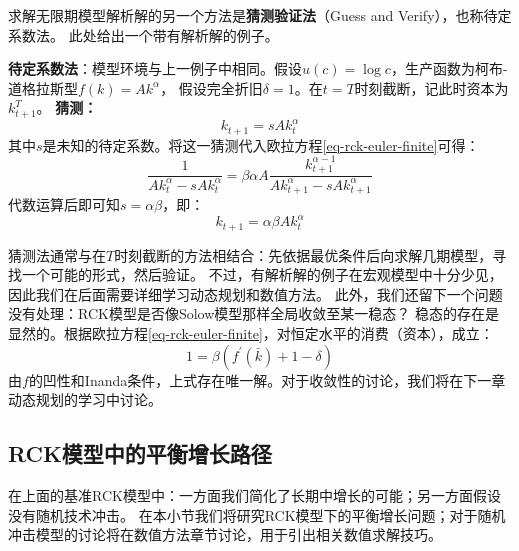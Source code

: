 求解无限期模型解析解的另一个方法是\textbf{猜测验证法}（Guess and Verify），也称待定系数法。
此处给出一个带有解析解的例子。
\begin{example}
    \textbf{待定系数法}：模型环境与上一例子中相同。假设$u(c)=\log c$，生产函数为柯布-道格拉斯型$f(k)=Ak^{\alpha}$，
    假设完全折旧$\delta=1$。在$t=T$时刻截断，记此时资本为$k_{t+1}^T$。
    \textbf{猜测：}
    \begin{equation*}
        k_{t+1} = s Ak_t^{\alpha}
    \end{equation*}
    其中$s$是未知的待定系数。将这一猜测代入欧拉方程\cref{eq-rck-euler-finite}可得：
    \begin{equation*}
        \frac{1}{A k_t^\alpha-s A k_t^\alpha} = 
            \beta \alpha A \frac{k_{t+1}^{\alpha-1}}{A k_{t+1}^\alpha-s A k_{t+1}^\alpha}
    \end{equation*}
    代数运算后即可知$s=\alpha\beta$，即：
    \begin{equation*}
        k_{t+1} = \alpha \beta A k_t^{\alpha}
    \end{equation*}
\end{example}

猜测法通常与在$T$时刻截断的方法相结合：先依据最优条件后向求解几期模型，寻找一个可能的形式，然后验证。
不过，有解析解的例子在宏观模型中十分少见，因此我们在后面需要详细学习动态规划和数值方法。
此外，我们还留下一个问题没有处理：RCK模型是否像Solow模型那样全局收敛至某一稳态？
稳态的存在是显然的。根据欧拉方程\cref{eq-rck-euler-finite}，对恒定水平的消费（资本），成立：
\begin{equation}
    1 = \beta \left(f^{\prime}(\bar{k})+1-\delta\right)
\end{equation}
由$f$的凹性和Inanda条件，上式存在唯一解。对于收敛性的讨论，我们将在下一章动态规划的学习中讨论。


\subsection{RCK模型中的平衡增长路径}

在上面的基准RCK模型中：一方面我们简化了长期中增长的可能；另一方面假设没有随机技术冲击。
在本小节我们将研究RCK模型下的平衡增长问题；对于随机冲击模型的讨论将在数值方法章节讨论，用于引出相关数值求解技巧。

